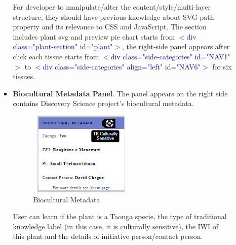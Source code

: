 \documentclass{scrreprt}
\begin{document}
\begin{enumerate}
\begin{itemize}
\begin{itemize}
\begin{figure}[h!]
    \label{fig:Start Tour}
\end{figure}
\newline
For developer to manipulate/alter the content/style/multi-layer structure, they should have previous knowledge about SVG path property and its relevance to CSS and JavaScript. The section includes plant svg and preview pie chart starts from  \textcolor{blue}{$<$div class="plant-section" id="plant"$>$}, the right-side panel appears after click each tissue starts from \textcolor{blue}{$<$div class="side-categories" id="NAV1"$>$} to \textcolor{blue}{$<$div class="side-categories" align="left" id="NAV6"$>$} for six tissues. 
\newline
\item \textbf{Biocultural Metadata Panel}. 
\newline
The panel appears on the right side contains Discovery Science project's biocultural metadata.
\newline
\begin{figure}[h!]
    \centering
    \includegraphics[width=5cm,height=4cm]{BioMetadata.PNG}
    \caption{Biocultural Metadata}
    \label{fig:Start Tour}
\end{figure}
User can learn if the plant is a Taonga specie, the type of traditional knowledge label (in this case, it is culturally sensitive), the IWI of this plant and the details of initiative person/contact person.


\end{itemize}
\end{itemize}
\end{enumerate}
\end{document}
